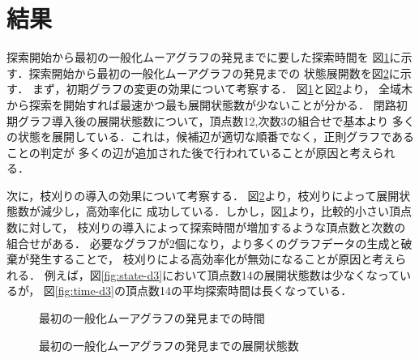 \section{結果}
探索開始から最初の一般化ムーアグラフの発見までに要した探索時間を
図\ref{fig:time}に示す．探索開始から最初の一般化ムーアグラフの発見までの
状態展開数を図\ref{fig:state}に示す．
まず，初期グラフの変更の効果について考察する．
図\ref{fig:time}と図\ref{fig:state}より，
全域木から探索を開始すれば最速かつ最も展開状態数が少ないことが分かる．
閉路初期グラフ導入後の展開状態数について，頂点数12,次数3の組合せで基本より
多くの状態を展開している．これは，候補辺が適切な順番でなく，正則グラフであることの判定が
多くの辺が追加された後で行われていることが原因と考えられる．

次に，枝刈りの導入の効果について考察する．
図\ref{fig:state}より，枝刈りによって展開状態数が減少し，高効率化に
成功している．しかし，図\ref{fig:time}より，比較的小さい頂点数に対して，
枝刈りの導入によって探索時間が増加するような頂点数と次数の組合せがある．
必要なグラフが2個になり，より多くのグラフデータの生成と破棄が発生することで，
枝刈りによる高効率化が無効になることが原因と考えられる．
例えば，図\ref{fig:state-d3}において頂点数14の展開状態数は少なくなっているが，
図\ref{fig:time-d3}の頂点数14の平均探索時間は長くなっている．

\begin{figure}
  \centering
  \noindent{}
  \caption{最初の一般化ムーアグラフの発見までの時間}
  \label{fig:time}
\end{figure}

\begin{figure}
  \centering
  \noindent{}
  \caption{最初の一般化ムーアグラフの発見までの展開状態数}
  \label{fig:state}
\end{figure}

